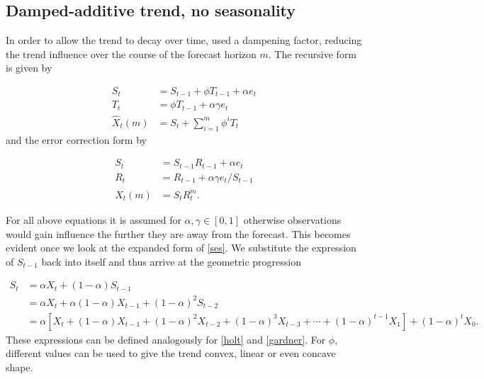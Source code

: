 \subsection*{Damped-additive trend, no seasonality}

In order to allow the trend to decay over time, \citet{gardner1989note} used a dampening factor, reducing the trend influence over the course of the forecast horizon $m$. The recursive form is given by 

\begin{equation}
	\label{gardner}
	\begin{array}{rl}
		S_{t}&=S_{t-1}+\phi T_{t-1}+\alpha e_{t} \\
		T_{t}&=\phi T_{t-1}+\alpha \gamma e_{t} \\
		\hat{X}_{t}(m)&=S_{t}+\sum_{i=1}^{m} \phi^{i} T_{t}
	\end{array}
\end{equation}
%
and the error correction form by

\begin{equation}
	\begin{array}{rl}
		S_{t}&=S_{t-1} R_{t-1}+\alpha e_{t} \\
		R_{t}&=R_{t-1}+\alpha \gamma e_{t} / S_{t-1} \\
		\hat{X}_{t}(m)&=S_{t} R_{t}^{m}.
	\end{array}
\end{equation}

For all above equations it is assumed for $\alpha, \gamma \in [0,1]$ otherwise observations would gain influence the further they are away from the forecast. This becomes evident once we look at the expanded form of \ref{ses}. We substitute the expression of $S_{t-1}$ back into itself and thus arrive at the geometric progression 

\begin{equation*}
	\begin{aligned}
		S_{t} &=\alpha X_{t}+(1-\alpha) S_{t-1} \\
		&=\alpha X_{t}+\alpha(1-\alpha) X_{t-1}+(1-\alpha)^{2} S_{t-2} \\
		&=\alpha\left[X_{t}+(1-\alpha) X_{t-1}+(1-\alpha)^{2} X_{t-2}+(1-\alpha)^{3} X_{t-3}+\cdots+(1-\alpha)^{t-1} X_{1}\right]+(1-\alpha)^{t} X_{0} .
	\end{aligned}
\end{equation*}
%
These expressions can be defined analogously for \ref{holt} and \ref{gardner}. For $\phi$, different values can be used to give the trend convex, linear or even concave shape. 

